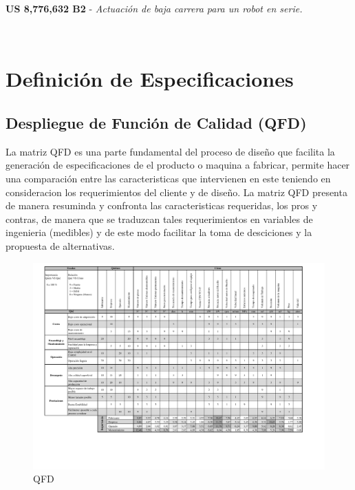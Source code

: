 \textbf{US 8,776,632 B2} - \textit{Actuación de baja carrera para un robot en serie.} \: 


~

\section{Definición de Especificaciones}
\subsection{Despliegue de Función de Calidad (QFD)}

La matriz QFD es una parte fundamental del proceso de diseño que facilita la generación de especificaciones de el producto o maquina a fabricar, permite hacer una comparación entre las caracteristicas que intervienen en este teniendo en consideracion los requerimientos del cliente y de diseño. La matriz QFD presenta de manera resuminda y confronta las caracteristicas requeridas, los pros y contras, de manera que se traduzcan tales requerimientos en variables de ingenieria (medibles) y de este modo facilitar la toma de desciciones y la propuesta de alternativas.

\begin{landscape}
\begin{figure}[hb!]
    \centering
    \includegraphics[scale=0.9]{Cap2_DisenoEspecificaciones/Figura/QFD.pdf}
    \caption{QFD}
    \label{fig:QFD}
\end{figure}
\end{landscape}

